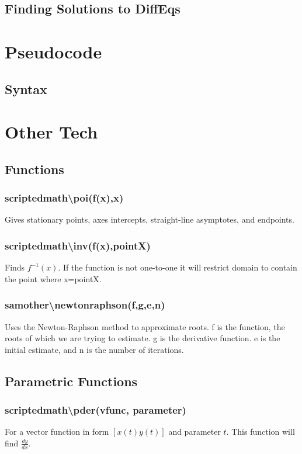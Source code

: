 \documentclass[a4paper,twoside]{article}
\begin{document}
		\subsection{Finding Solutions to DiffEqs}
			
	\section{Pseudocode}
		\subsection{Syntax}
		
	\section{Other Tech}
		\subsection{Functions}
			\subsubsection{scriptedmath\textbackslash poi(f(x),x)} Gives stationary points, axes intercepts, straight-line asymptotes, and endpoints.
			\subsubsection{scriptedmath\textbackslash inv(f(x),pointX)} Finds $f^{-1}(x)$. If the function is not one-to-one it will restrict domain to contain the point where x=pointX.
			\subsubsection{sam\textunderscore other\textbackslash newtonraphson(f,g,e,n)} Uses the Newton-Raphson method to approximate roots. f is the function, the roots of which we are trying to estimate. g is the derivative function. e is the initial estimate, and n is the number of iterations.
		\subsection{Parametric Functions}
			\subsubsection{scriptedmath\textbackslash pder(vfunc, parameter)} For a vector function in form $[x(t) y(t)]$ and parameter $t$. This function will find $\frac{dy}{dx}$.
\end{document}
